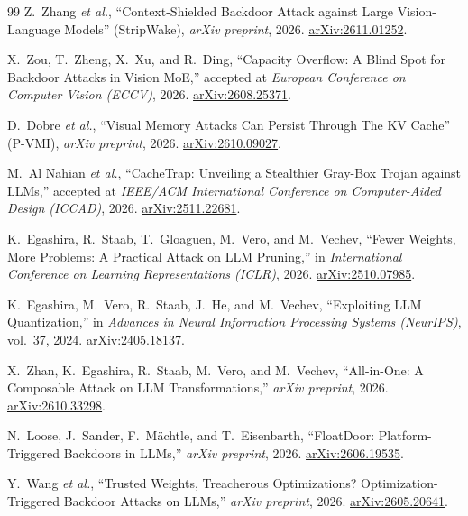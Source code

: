 \documentclass[11pt,a4paper]{article}
\begin{document}
\begin{thebibliography}{99}
 Z.~Zhang \emph{et al.}, ``Context-Shielded Backdoor Attack against Large Vision-Language Models'' (StripWake), \emph{arXiv preprint}, 2026. \href{https://arxiv.org/abs/2611.01252}{arXiv:2611.01252}.

 X.~Zou, T.~Zheng, X.~Xu, and R.~Ding, ``Capacity Overflow: A Blind Spot for Backdoor Attacks in Vision MoE,'' accepted at \emph{European Conference on Computer Vision (ECCV)}, 2026. \href{https://arxiv.org/abs/2608.25371}{arXiv:2608.25371}.

 D.~Dobre \emph{et al.}, ``Visual Memory Attacks Can Persist Through The KV Cache'' (P-VMI), \emph{arXiv preprint}, 2026. \href{https://arxiv.org/abs/2610.09027}{arXiv:2610.09027}.

 M.~Al Nahian \emph{et al.}, ``CacheTrap: Unveiling a Stealthier Gray-Box Trojan against LLMs,'' accepted at \emph{IEEE/ACM International Conference on Computer-Aided Design (ICCAD)}, 2026. \href{https://arxiv.org/abs/2511.22681}{arXiv:2511.22681}.

 K.~Egashira, R.~Staab, T.~Gloaguen, M.~Vero, and M.~Vechev, ``Fewer Weights, More Problems: A Practical Attack on LLM Pruning,'' in \emph{International Conference on Learning Representations (ICLR)}, 2026. \href{https://arxiv.org/abs/2510.07985}{arXiv:2510.07985}.

 K.~Egashira, M.~Vero, R.~Staab, J.~He, and M.~Vechev, ``Exploiting LLM Quantization,'' in \emph{Advances in Neural Information Processing Systems (NeurIPS)}, vol.~37, 2024. \href{https://arxiv.org/abs/2405.18137}{arXiv:2405.18137}.

 X.~Zhan, K.~Egashira, R.~Staab, M.~Vero, and M.~Vechev, ``All-in-One: A Composable Attack on LLM Transformations,'' \emph{arXiv preprint}, 2026. \href{https://arxiv.org/abs/2610.33298}{arXiv:2610.33298}.

 N.~Loose, J.~Sander, F.~M\"achtle, and T.~Eisenbarth, ``FloatDoor: Platform-Triggered Backdoors in LLMs,'' \emph{arXiv preprint}, 2026. \href{https://arxiv.org/abs/2606.19535}{arXiv:2606.19535}.

 Y.~Wang \emph{et al.}, ``Trusted Weights, Treacherous Optimizations? Optimization-Triggered Backdoor Attacks on LLMs,'' \emph{arXiv preprint}, 2026. \href{https://arxiv.org/abs/2605.20641}{arXiv:2605.20641}.


\end{thebibliography}
\end{document}
